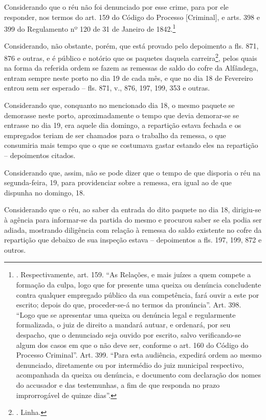Considerando que o réu não foi denunciado por esse crime, para por ele
responder, nos termos do art. 159 do Código do Processo {[}Criminal{]},
e arts. 398 e 399 do Regulamento nº 120 de 31 de Janeiro de
1842.\footnote{. Respectivamente, art. 159. ``As Relações, e mais juízes
  a quem compete a formação da culpa, logo que for presente uma queixa
  ou denúncia concludente contra qualquer empregado público da sua
  competência, fará ouvir a este por escrito; depois do que,
  proceder-se-á no termos da pronúncia''. Art. 398. ``Logo que se
  apresentar uma queixa ou denúncia legal e regularmente formalizada, o
  juiz de direito a mandará autuar, e ordenará, por seu despacho, que o
  denunciado seja ouvido por escrito, salvo verificando-se algum dos
  casos em que o não deve ser, conforme o art. 160 do Código do Processo
  Criminal''. Art. 399. ``Para esta audiência, expedirá ordem ao mesmo
  denunciado, diretamente ou por intermédio do juiz municipal
  respectivo, acompanhada da queixa ou denúncia, e documento com
  declaração dos nomes do accusador e das testemunhas, a fim de que
  responda no prazo improrrogável de quinze dias''.}

Considerando, não obstante, porém, que está provado pelo depoimento a
fls. 871, 876 e outras, e é público e notório que os paquetes daquela
carreira\footnote{. Linha.},
pelo\protect\hypertarget{Secao_Sem_Titulo-28}{}{}s quais na forma da
referida ordem se fazem as remessas de saldo do cofre da Alfândega,
entram sempre neste porto no dia 19 de cada mês, e que no dia 18 de
Fevereiro entrou sem ser esperado -- fls. 871, v., 876, 197, 199, 353 e
outras.

Considerando que, conquanto no mencionado dia 18, o mesmo paquete se
demorasse neste porto, aproximadamente o tempo que devia demorar-se se
entrasse no dia 19, era aquele dia domingo, a repartição estava fechada
e os empregados teriam de ser chamados para o trabalho da remessa, o que
consumiria mais tempo que o que se costumava gastar estando eles na
repartição -- depoimentos citados.

Considerando que, assim, não se pode dizer que o tempo de que disporia o
réu na segunda-feira, 19, para providenciar sobre a remessa, era igual
ao de que dispunha no domingo, 18.

Considerando que o réu, ao saber da entrada do dito paquete no dia 18,
dirigiu-se à agência para informar-se da partida do mesmo e procurou
saber se ela podia ser adiada, mostrando diligência com relação à
remessa do saldo existente no cofre da repartição que debaixo de sua
inspeção estava -- depoimentos a fls. 197, 199, 872 e outros.

